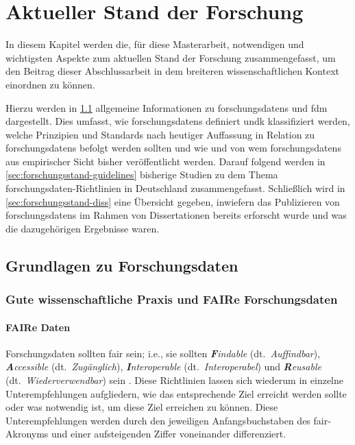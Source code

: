 \chapter{Aktueller Stand der Forschung}\label{ch:forschungsstand}
In diesem Kapitel werden die, für diese Masterarbeit, notwendigen und wichtigsten Aspekte zum aktuellen Stand der Forschung zusammengefasst, um den Beitrag dieser Abschlussarbeit in dem breiteren wissenschaftlichen Kontext einordnen zu können.

Hierzu werden in \cref{sec:forschungsstand-basics} allgemeine Informationen zu \glspl{forschungsdaten} und \gls{fdm} dargestellt.
Dies umfasst, wie \glspl{forschungsdaten} definiert undk klassifiziert werden, welche Prinzipien und Standards nach heutiger Auffassung in Relation zu \glspl{forschungsdaten} befolgt werden sollten und wie und von wem \glspl{forschungsdaten} aus empirischer Sicht bisher veröffentlicht werden.
Darauf folgend werden in \cref{sec:forschungsstand-guidelines} bisherige Studien zu dem Thema \gls{forschungsdaten}-Richtlinien in Deutschland zusammengefasst.
Schließlich wird in \cref{sec:forschungsstand-diss} eine Übersicht gegeben, inwiefern das Publizieren von \glspl{forschungsdaten} im Rahmen von Dissertationen bereits erforscht wurde und was die dazugehörigen Ergebnisse waren.

\section{Grundlagen zu Forschungsdaten}\label{sec:forschungsstand-basics}
\autocite{dfg-positionspapier,hrk-fdm}
\autocite{bmbf2024,dfg2023-gesetz}
\autocite{Tenopir2011}
\autocite{Piwowar2013-DataReuse}

\subsection{Gute wissenschaftliche Praxis und
FAIRe Forschungsdaten}\label{sec:forschungsstand-basics-gwp-fair}
\autocite{dfg-gwp}

\subsubsection{FAIRe Daten}
Forschungsdaten sollten \gls{fair} sein; i.e., sie sollten \textit{\textbf{F}indable} (dt.~\textit{Auffindbar}), \textit{\textbf{A}ccessible} (dt.~\textit{Zugänglich}), \textit{\textbf{I}nteroperable} (dt.~\textit{Interoperabel}) und \textit {\textbf{R}eusable} (dt.~\textit{Wiederverwendbar}) sein \autocite{Wilkinson2016}.
Diese Richtlinien lassen sich wiederum in einzelne Unterempfehlungen aufgliedern, wie das entsprechende Ziel erreicht werden sollte oder was notwendig ist, um diese Ziel erreichen zu können.
Diese Unterempfehlungen werden durch den jeweiligen Anfangsbuchstaben des \gls{fair}-Akronyms und einer aufsteigenden Ziffer voneinander differenziert.

